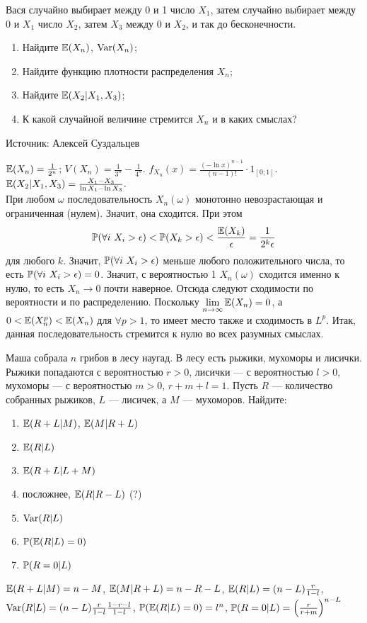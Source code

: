 \begin{problem}
 Вася случайно выбирает между 0 и 1 число $X_1$, затем случайно выбирает между 0 и $X_1$ число $X_2$, затем $X_3$ между 0 и $X_{2}$, и так до бесконечности.
\begin{enumerate}
  \item Найдите $\E(X_n)$, $\Var(X_n)$;
  \item Найдите функцию плотности распределения $X_n$;
  \item Найдите $\E(X_2|X_1,X_3)$;
\item К какой случайной величине стремится $X_n$ и в каких смыслах?
\end{enumerate}

Источник: Алексей Суздальцев
\end{problem} 
\begin{solution} 

$\E(X_n)=\frac{1}{2^n}$; $V(X_n)=\frac{1}{3^n}-\frac{1}{4^n}$. $f_{X_n}(x)=\frac{(-\ln{x})^{n-1}}{(n-1)!}\cdot 1_{[0;1]}.$\\
$\E(X_2|X_1,X_3)=\frac{X_1-X_3}{\ln{X_1}-\ln{X_3}}.$\\
При любом $\omega$ последовательность $X_n(\omega)$ монотонно невозрастающая и ограниченная (нулем). Значит, она сходится. При этом
\[
 \P(\forall i \mbox{ } X_i>\epsilon)<\P(X_k>\epsilon)<\frac{\E(X_k)}{\epsilon}=\frac{1}{2^k\epsilon}
 \] 
 для любого $k$. Значит, $\P(\forall i \mbox{ }X_i>\epsilon)$ меньше любого положительного числа, то есть $\P(\forall i\mbox{ }X_i>\epsilon)=0$. Значит, с вероятностью 1 $X_n(\omega)$ сходится именно к нулю, то есть $X_n\to 0$ почти наверное. Отсюда следуют сходимости по вероятности и по распределению. Поскольку $\lim\limits_{n\to \infty}\E(X_n)=0$, а $0<\E(X_n^p)<\E(X_n)$ для $\forall p>1$, то имеет место также и сходимость в $L^p$. Итак, данная последовательность стремится к нулю во всех разумных смыслах.
\end{solution}

\begin{problem}
Маша собрала $n$ грибов в лесу наугад. В лесу есть рыжики, мухоморы и лисички. Рыжики попадаются с вероятностью $r>0$, лисички --- с вероятностью $l>0$,  мухоморы --- с вероятностью $m>0$, $r+m+l=1$. Пусть $R$ --- количество собранных рыжиков, $L$ --- лисичек, а $M$ --- мухоморов. Найдите:
\begin{enumerate}
\item $\E(R+L|M)$, $\E(M|R+L)$
\item $\E(R|L)$
\item $\E(R+L|L+M)$
\item посложнее, $\E(R|R-L)$ (?)
\item $\Var(R|L)$
\item $\P(\E(R|L)=0)$
\item $\P(R=0 | L)$
\end{enumerate}
\end{problem} 
\begin{solution} 
$\E(R+L|M)=n-M$, $\E(M|R+L)=n-R-L$, $\E(R|L)=(n-L)\frac{r}{1-l}$, $\Var(R|L)=(n-L)\frac{r}{1-l}\frac{1-r-l}{1-l}$, $\P(\E(R|L)=0)=l^{n}$, $\P(R=0 | L)=\left(\frac{r}{r+m}\right)^{n-L}$
\end{solution}

